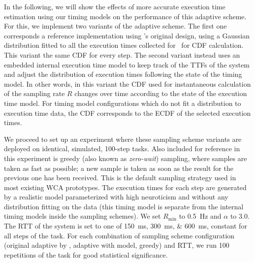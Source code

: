 In the following, we will show the effects of more accurate execution time estimation using our timing models on the performance of this adaptive scheme.
For this, we implement two variants of the adaptive scheme.
The first one corresponds a reference implementation using \citeauthor{Wang2019Towards}'s original design, using a Gaussian distribution fitted to all the execution times collected for~\cite{olguinmunoz:impact2021} for \ac{CDF} calculation.
This variant the same \ac{CDF} for every step.
The second variant instead uses an embedded internal execution time model to keep track of the \acp{TTF} of the system and adjust the distribution of execution times following the state of the timing model.
In other words, in this variant the \ac{CDF} used for instantaneous calculation of the sampling rate \( R \) changes over time according to the state of the execution time model.
For timing model configurations which do not fit a distribution to execution time data, the \ac{CDF} corresponds to the \ac{ECDF} of the selected execution times.

We proceed to set up an experiment where these sampling scheme variants are deployed on identical, simulated, \num{100}-step tasks.
Also included for reference in this experiment is greedy (also known as \emph{zero-wait}) sampling, where samples are taken as fast as possible; a new sample is taken as soon as the result for the previous one has been received.
This is the default sampling strategy used in most existing \ac{WCA} prototypes.
The execution times for each step are generated by a realistic model parameterized with high neuroticism and without any distribution fitting on the data (this timing model is separate from the internal timing models inside the sampling schemes).
We set \( R_\text{min} \) to \SI{0.5}{\hertz} and \( \alpha \) to \num{3.0}.
The \ac{RTT} of the system is set to one of \SIlist[list-final-separator={, or}]{150;300;600}{\milli\second}, constant for all steps of the task.
For each combination of sampling scheme configuration (original adaptive by \textcite{Wang2019Towards}, adaptive with \edgedroid{} model, greedy) and \ac{RTT}, we run \num{100} repetitions of the task for good statistical significance.

